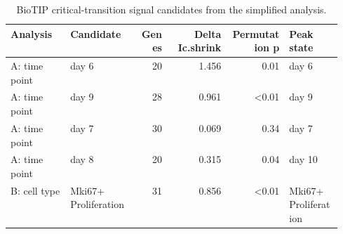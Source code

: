 \begin{table}[H]
\centering
\caption{BioTIP critical-transition signal candidates from the simplified analysis.}
\label{tab:biotip-results}
\begin{tabular}{p{0.18\linewidth}p{0.21\linewidth}r r r p{0.16\linewidth}}
\toprule
Analysis & Candidate & Genes & Delta Ic.shrink & Permutation p & Peak state
\\
\midrule
A: time point & day 6 & 20 & 1.456 & 0.01 & day 6\\
A: time point & day 9 & 28 & 0.961 & <0.01 & day 9\\
A: time point & day 7 & 30 & 0.069 & 0.34 & day 7\\
A: time point & day 8 & 20 & 0.315 & 0.04 & day 10\\
B: cell type & Mki67+ Proliferation & 31 & 0.856 & <0.01 & Mki67+ Proliferation\\
\bottomrule
\end{tabular}
\end{table}
